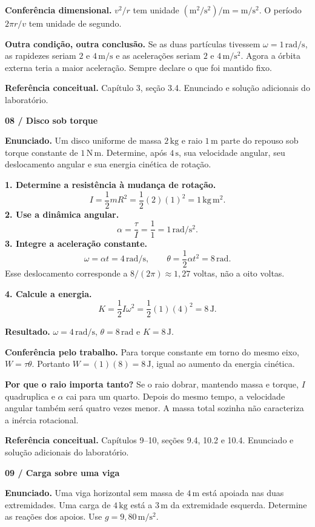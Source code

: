 \documentclass[11pt,a4paper]{article}
\newcommand{\result}[1]{\par\colorbox{pale}{\parbox{\dimexpr\linewidth-2\fboxsep}{\vspace{4pt}\textbf{Resultado.} #1\vspace{4pt}}}\par}
\newcommand{\exercise}[2]{{\LARGE\bfseries\color{ink}#1}\par\vspace{3pt}{\large #2}\par\vspace{5pt}}
\begin{document}
\textbf{Conferência dimensional.} $v^2/r$ tem unidade $(\mathrm{m^2/s^2})/\mathrm m=\mathrm{m/s^2}$. O período $2\pi r/v$ tem unidade de segundo.

\textbf{Outra condição, outra conclusão.} Se as duas partículas tivessem $\omega=1\,\mathrm{rad/s}$, as rapidezes seriam $2$ e $4\,\mathrm{m/s}$ e as acelerações seriam $2$ e $4\,\mathrm{m/s^2}$. Agora a órbita externa teria a maior aceleração. Sempre declare o que foi mantido fixo.

\textbf{Referência conceitual.} Capítulo 3, seção 3.4. Enunciado e solução adicionais do laboratório.

\newpage
\exercise{08 / Disco sob torque}{Exercício adicional do laboratório}
\textbf{Enunciado.} Um disco uniforme de massa $2\,\mathrm{kg}$ e raio $1\,\mathrm m$ parte do repouso sob torque constante de $1\,\mathrm{N\,m}$. Determine, após $4\,\mathrm s$, sua velocidade angular, seu deslocamento angular e sua energia cinética de rotação.

\textbf{1. Determine a resistência à mudança de rotação.}
\[
I=\frac12mR^2=\frac12(2)(1)^2=1\,\mathrm{kg\,m^2}.
\]
\textbf{2. Use a dinâmica angular.}
\[
\alpha=\frac{\tau}{I}=\frac11=1\,\mathrm{rad/s^2}.
\]
\textbf{3. Integre a aceleração constante.}
\[
\omega=\alpha t=4\,\mathrm{rad/s},\qquad
\theta=\frac12\alpha t^2=8\,\mathrm{rad}.
\]
Esse deslocamento corresponde a $8/(2\pi)\approx1{,}27$ voltas, não a oito voltas.

\textbf{4. Calcule a energia.}
\[
K=\frac12I\omega^2=\frac12(1)(4)^2=8\,\mathrm J.
\]
\result{$\omega=4\,\mathrm{rad/s}$, $\theta=8\,\mathrm{rad}$ e $K=8\,\mathrm J$.}

\textbf{Conferência pelo trabalho.} Para torque constante em torno do mesmo eixo, $W=\tau\theta$. Portanto $W=(1)(8)=8\,\mathrm J$, igual ao aumento da energia cinética.

\textbf{Por que o raio importa tanto?} Se o raio dobrar, mantendo massa e torque, $I$ quadruplica e $\alpha$ cai para um quarto. Depois do mesmo tempo, a velocidade angular também será quatro vezes menor. A massa total sozinha não caracteriza a inércia rotacional.

\textbf{Referência conceitual.} Capítulos 9--10, seções 9.4, 10.2 e 10.4. Enunciado e solução adicionais do laboratório.

\newpage
\exercise{09 / Carga sobre uma viga}{Exercício adicional do laboratório}
\textbf{Enunciado.} Uma viga horizontal sem massa de $4\,\mathrm m$ está apoiada nas duas extremidades. Uma carga de $4\,\mathrm{kg}$ está a $3\,\mathrm m$ da extremidade esquerda. Determine as reações dos apoios. Use $g=9{,}80\,\mathrm{m/s^2}$.
\end{document}
